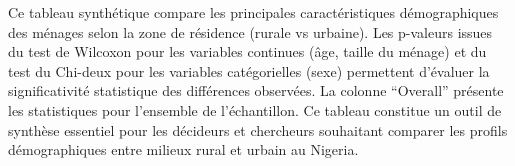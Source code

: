 \documentclass[
]{article}
\begin{document}
\begin{table}[!h]
\centering
\caption{\label{tab:gtsummary}\textbf{Tableau 1 -- Caracteristiques demographiques par zone (Wave 4)}}
\centering
{}
\end{table}

Ce tableau synthétique compare les principales caractéristiques
démographiques des ménages selon la zone de résidence (rurale vs
urbaine). Les p-valeurs issues du test de Wilcoxon pour les variables
continues (âge, taille du ménage) et du test du Chi-deux pour les
variables catégorielles (sexe) permettent d'évaluer la significativité
statistique des différences observées. La colonne ``Overall'' présente
les statistiques pour l'ensemble de l'échantillon. Ce tableau constitue
un outil de synthèse essentiel pour les décideurs et chercheurs
souhaitant comparer les profils démographiques entre milieux rural et
urbain au Nigeria.
\end{document}
